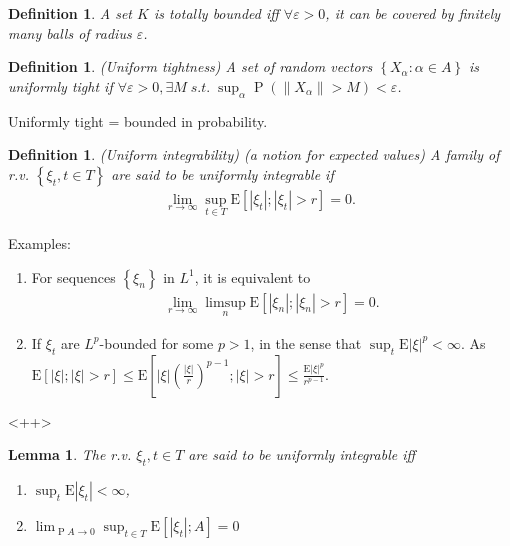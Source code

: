 \documentclass[12pt,a4paper]{article}
\newcommand{\E}{\mathop{\mathbb{E}}}
\newcommand{\pr}{\mathop{\mathrm{P}}}
\def \E{\mbox{E}}
\newtheorem{lemma}[theorem]{Lemma}
\newtheorem{definition}[theorem]{Definition}
\begin{document}
\newpage
\begin{definition}
  A set $K$ is totally bounded iff $\forall \varepsilon>0$, it can be covered by finitely many balls of radius $\varepsilon$.
\end{definition}



\begin{definition}
  (Uniform tightness)
  A set of random vectors $\left\{ X_\alpha:\alpha\in A \right\}$ is {uniformly tight} if $\forall \varepsilon>0, \exists M \; s.t. \; \sup_{\alpha} \pr(\|X_\alpha\|>M) <\varepsilon$.
\end{definition}

Uniformly tight = bounded in probability.

\begin{definition}
  (Uniform integrability) (a notion for expected values)
  A family of r.v. $\left\{ \xi_t,t\in T \right\}$ are said to be uniformly integrable if
  \begin{align*}
	\lim_{r\to\infty} \sup_{t\in T}\E \left[ |\xi_t|;|\xi_t|>r \right] = 0.
  \end{align*}
  \label{def:ui}
\end{definition}

Examples:
\begin{enumerate}
  \item For sequences $\left\{ \xi_n \right\}$ in $L^1$, it is equivalent to
\begin{align*}
\lim_{r\to\infty} \limsup_{n}\E \left[ |\xi_n|;|\xi_n|>r \right] = 0.
\end{align*}

  \item If $\xi_t$ are $L^p$-bounded for some $p>1$, in the sense that $\sup_t \E |\xi|^p <\infty$. As $\E\left[ |\xi|;|\xi|>r \right]\le \E\left[ |\xi|\left(\frac{|\xi|}{r}\right)^{p-1};|\xi|>r \right] \le \frac{\E|\xi|^p}{r^{p-1}}$.

\end{enumerate}<++>

\begin{lemma}
  The r.v. $\xi_t,t\in T$ are said to be uniformly integrable iff
 \begin{enumerate}
	\item $\sup_t \E|\xi_t|<\infty$,
	\item $\lim_{\pr A \to 0} \sup_{t\in T} \E[|\xi_t|;A]=0$
  \end{enumerate}
 \label{lem:ui}
\end{lemma}
\end{document}
